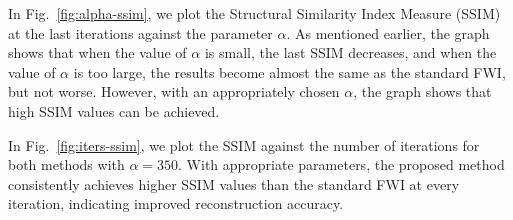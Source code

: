 
In Fig.~\ref{fig:alpha-ssim}, we plot the Structural Similarity Index Measure (SSIM) at the last iterations against the parameter $\alpha$.
As mentioned earlier, the graph shows that when the value of $\alpha$ is small, the last SSIM decreases, and when the value of $\alpha$ is too large, the results become almost the same as the standard FWI, but not worse.
However, with an appropriately chosen $\alpha$, the graph shows that high SSIM values can be achieved.




In Fig.~\ref{fig:iters-ssim}, we plot the SSIM against the number of iterations for both methods with $\alpha=350$.
With appropriate parameters, the proposed method consistently achieves higher SSIM values than the standard FWI at every iteration, indicating improved reconstruction accuracy.

